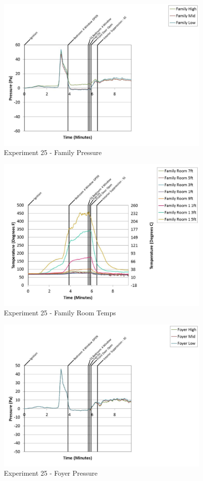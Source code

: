 \documentclass{article}
\begin{document}
\begin{appendices}
	\clearpage

	\begin{figure}[h!]
		\centering
		\includegraphics[height=3.05in]{0_Images/Results_Charts/Exp_25_Charts/FamilyPressure.pdf}
		\caption{Experiment 25 - Family Pressure}
	\end{figure}
 

	\begin{figure}[h!]
		\centering
		\includegraphics[height=3.05in]{0_Images/Results_Charts/Exp_25_Charts/FamilyRoomTemps.pdf}
		\caption{Experiment 25 - Family Room Temps}
	\end{figure}
 
	\clearpage

	\begin{figure}[h!]
		\centering
		\includegraphics[height=3.05in]{0_Images/Results_Charts/Exp_25_Charts/FoyerPressure.pdf}
		\caption{Experiment 25 - Foyer Pressure}
	\end{figure}
 


\end{appendices}
\end{document}
